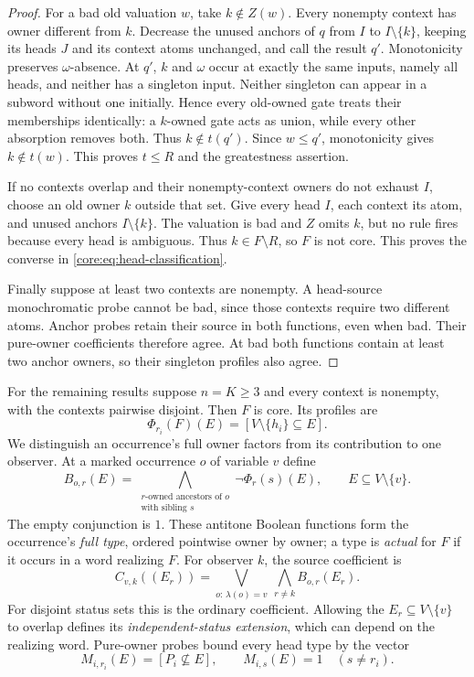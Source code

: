 \begin{proof}
For a bad old valuation $w$, take $k\notin Z(w)$. Every nonempty
context has owner different from $k$. Decrease the unused anchors of
$q$ from $I$ to $I\setminus\{k\}$, keeping its heads $J$ and its
context atoms unchanged, and call the result $q'$. Monotonicity preserves
$\omega$-absence. At $q'$, $k$ and $\omega$ occur at exactly the same
inputs, namely all heads, and neither has a singleton input. Neither
singleton can appear in a subword without one initially. Hence every
old-owned gate treats their memberships identically: a $k$-owned gate
acts as union, while every other absorption removes both. Thus
$k\notin t(q')$. Since $w\leq q'$, monotonicity gives $k\notin t(w)$.
This proves $t\leq R$ and the greatestness assertion.

If no contexts overlap and their nonempty-context owners do not exhaust
$I$, choose an old owner $k$ outside that set. Give every head $I$,
each context its atom, and unused anchors $I\setminus\{k\}$. The
valuation is bad and $Z$ omits $k$, but no rule fires because every
head is ambiguous. Thus $k\in F\setminus R$, so $F$ is not core.
This proves the converse in \eqref{core:eq:head-classification}.

Finally suppose at least two contexts are nonempty. A head-source
monochromatic probe cannot be bad, since those contexts require two
different atoms. Anchor probes retain their source in both functions,
even when bad. Their pure-owner coefficients therefore agree. At bad
both functions contain at least two anchor owners, so their singleton
profiles also agree.
\end{proof}

For the remaining results suppose $n=K\geq3$ and every context is
nonempty, with the contexts pairwise disjoint. Then $F$ is core.
Its profiles are
\begin{equation}\label{core:eq:head-profiles}
 \Phi_{r_i}(F)(E)=[V\setminus\{h_i\}\subseteq E].
\end{equation}
We distinguish an occurrence's full owner factors from its contribution
to one observer. At a marked occurrence $o$ of variable $v$ define
\[
 B_{o,r}(E)=\bigwedge_{
   \substack{\text{$r$-owned ancestors of }o\\\text{with sibling }s}}
          \neg\Phi_r(s)(E),\qquad E\subseteq V\setminus\{v\}.
\]
The empty conjunction is $1$. These antitone Boolean functions form
the occurrence's \emph{full type}, ordered pointwise owner by owner;
a type is \emph{actual} for $F$
if it occurs in a word realizing $F$. For observer $k$, the source
coefficient is
\begin{equation}\label{core:eq:head-free-coefficient}
 C_{v,k}((E_r))=
 \bigvee_{o:\,\lambda(o)=v}\ \bigwedge_{r\ne k} B_{o,r}(E_r).
\end{equation}
For disjoint status sets this is the ordinary coefficient. Allowing
the $E_r\subseteq V\setminus\{v\}$ to overlap defines its
\emph{independent-status extension}, which can depend on the realizing
word. Pure-owner probes bound every head type by the vector
\begin{equation}\label{core:eq:head-max-type}
 M_{i,r_i}(E)=[P_i\nsubseteq E],\qquad
 M_{i,s}(E)=1\quad(s\ne r_i).
\end{equation}

